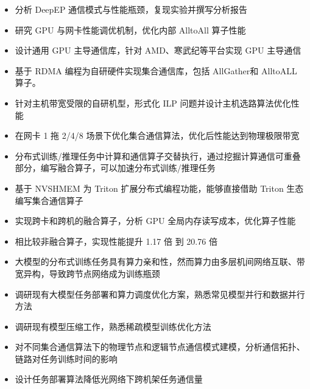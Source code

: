 \documentclass{resume}
\begin{document}
\begin{itemize}[parsep=0.5ex]
  \item 分析 DeepEP 通信模式与性能瓶颈，复现实验并撰写分析报告
  \item 研究 GPU 与网卡性能调优机制，优化内部 AlltoAll 算子性能
  \item 设计通用 GPU 主导通信库，针对 AMD、寒武纪等平台实现 GPU 主导通信
\end{itemize}

\begin{itemize}[parsep=0.5ex]
  \item 基于 RDMA 编程为自研硬件实现集合通信库，包括 AllGather和 AlltoALL 算子。
  \item 针对主机带宽受限的自研机型，形式化 ILP 问题并设计主机选路算法优化性能
  \item 在网卡 1 拖 2/4/8 场景下优化集合通信算法，优化后性能达到物理极限带宽
\end{itemize}

\begin{itemize}[parsep=0.5ex]
  \item 分布式训练/推理任务中计算和通信算子交替执行，通过挖掘计算通信可重叠部分，编写融合算子，可以加速分布式训练/推理任务
  \item 基于 NVSHMEM 为 Triton 扩展分布式编程功能，能够直接借助 Triton 生态编写集合通信算子
  \item 实现跨卡和跨机的融合算子，分析 GPU 全局内存读写成本，优化算子性能
  \item 相比较非融合算子，实现性能提升 1.17 倍 到 20.76 倍
\end{itemize}

\begin{itemize}[parsep=0.5ex]
  \item 大模型的分布式训练任务具有算力亲和性，然而算力由多层机间网络互联、带宽异构，导致跨节点网络成为训练瓶颈
  \item 调研现有大模型任务部署和算力调度优化方案，熟悉常见模型并行和数据并行方法
  \item 调研现有模型压缩工作，熟悉稀疏模型训练优化方法
  \item 对不同集合通信算法下的物理节点和逻辑节点通信模式建模，分析通信拓扑、链路对任务训练时间的影响
  \item 设计任务部署算法降低光网络下跨机架任务通信量
\end{itemize}
\end{document}
